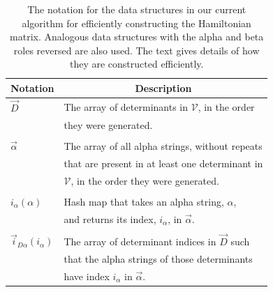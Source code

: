 \documentclass[%
reprint,
 superscriptaddress,
 amsmath,amssymb,
 aps,
]{revtex4-1}
\def\V{\mathcal{V}}
\def\vecD{\vec{D}}
\def\veca{\vec{\alpha}}
\def\ia{i_\alpha}
\def\veciDa{\vec{i}_{D\alpha}}
\begin{document}
\begin{table}[h]
\caption{The notation for the data structures in our current algorithm for efficiently constructing the Hamiltonian matrix.
Analogous data structures with the alpha and beta roles reversed are also used.
The text gives details of how they are constructed efficiently.}
\begin{tabular}{ll}
\hline
\hline
Notation& \multicolumn{1}{c}{Description}\\
\hline
$\vecD$ & The array of determinants in $\V$, in the order\\
& they were generated. \\
&\\
$\veca$ & The array of all alpha strings, without repeats\\
& that are present in at least one determinant in\\
& $\V$, in the order they were generated. \\
&\\
$\ia(\alpha)$ & Hash map that takes an alpha string, $\alpha$, \\
& and returns its index, $\ia$, in $\veca$. \\
&\\
$\veciDa(\ia)$ & The array of determinant indices in $\vecD$ such\\
& that the alpha strings of those determinants \\
& have index $\ia$ in $\veca$. \\

\end{tabular}
\end{table}
\end{document}
